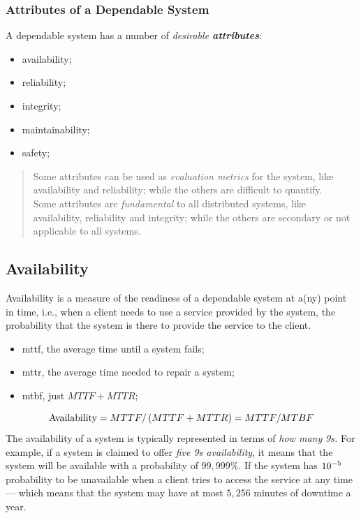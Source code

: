 \documentclass[11pt, a4paper]{article}
\begin{document}
\subsubsection{Attributes of a Dependable System}\label{sec:attributes_of_a_dependable_system} %
A dependable system has a number of \textit{desirable \textbf{attributes}}:
\begin{itemize}
    \item availability;
    \item reliability;
    \item integrity;
    \item maintainability;
    \item safety;
\end{itemize}
\begin{quote}
    Some attributes can be used as \textit{evaluation metrics} for the system, like availability and reliability; while the others are difficult to quantify.
    \\
    Some attributes are \textit{fundamental} to all distributed systems, like availability, reliability and integrity; while the others are secondary or not applicable to all systems.
\end{quote}
\subsection{Availability}\label{sub:availability} %
Availability is a measure of the readiness of a dependable system at a(ny) point in time, i.e., when a client needs to use a service provided by the system, the probability that the system is there to provide the service to the client.
\begin{note}
    \begin{itemize}
        \item \ac{mttf}, the average time until a system fails;
        \item \ac{mttr}, the average time needed to repair a system;
        \item \ac{mtbf}, just $MTTF + MTTR$;
    \end{itemize}
\end{note}
\begin{equation*}
    \text{Availability} = MTTF / \left({MTTF + MTTR}\right) = MTTF / MTBF
\end{equation*}
The availability of a system is typically represented in terms of \textit{how many 9s.}
For example, if a system is claimed to offer \textit{five 9s availability}, it means that the system will be available with a probability of $99,999\%$.
If the system has ${10}^{-5}$ probability to be unavailable when a client tries to access the service at any time --- which means that the system may have at most $5,256$ minutes of downtime a year.
\end{document}
